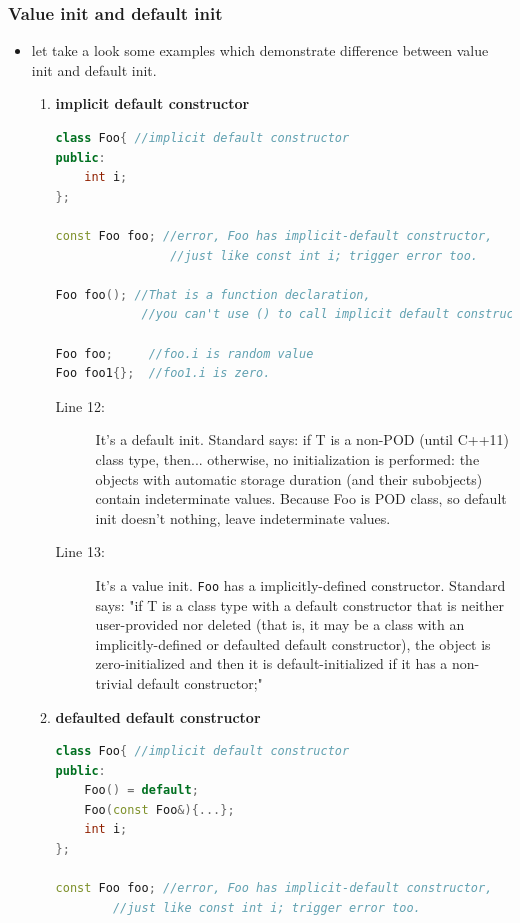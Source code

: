 \documentclass[a4paper,11pt,twoside]{book}
\begin{document}
\subsubsection{Value init and default init}
\begin{itemize}
 
	\item let take a look some examples which demonstrate difference between value init and default init.
	\begin{enumerate}
		\item \textbf{implicit default constructor}
\begin{lstlisting}[frame=single, language=c++]
class Foo{ //implicit default constructor
public:
	int i;
};

const Foo foo; //error, Foo has implicit-default constructor, 
				//just like const int i; trigger error too.
				
Foo foo(); //That is a function declaration, 
			//you can't use () to call implicit default constructor.

Foo foo;     //foo.i is random value
Foo foo1{};	 //foo1.i is zero.		 
\end{lstlisting}

\begin{description}			
\item[Line 12:]	 It's a default init. Standard says: if T is a non-POD (until C++11) class type, then... otherwise, no initialization is performed: the objects with automatic storage duration (and their subobjects) contain indeterminate values.
Because Foo is POD class, so default init doesn't nothing, leave indeterminate values.

\item[Line 13:]  It's a value init. \texttt{Foo} has a implicitly-defined constructor. Standard says: "if T is a class type with a default constructor that is neither user-provided nor deleted (that is, it may be a class with an implicitly-defined or defaulted default constructor), the object is zero-initialized and then it is default-initialized if it has a non-trivial default constructor;"
\end{description}

		\item \textbf{defaulted default constructor}
\begin{lstlisting}[frame=single, language=c++]
class Foo{ //implicit default constructor
public:
	Foo() = default;
	Foo(const Foo&){...};
	int i;
};
	
const Foo foo; //error, Foo has implicit-default constructor, 
		//just like const int i; trigger error too.
	

\end{lstlisting}
\end{enumerate}
\end{itemize}
\end{document}
